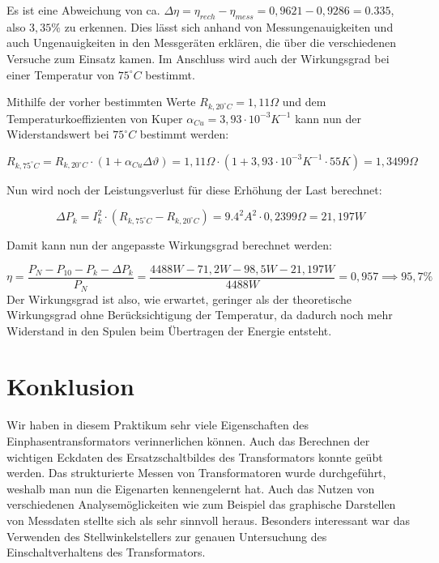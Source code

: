\documentclass{article}
\begin{document}
Es ist eine Abweichung von ca. $\Delta \eta = \eta_{rech} - \eta_{mess} = 0,9621 - 0,9286 = 0.335$, also $3,35\%$ zu erkennen. Dies lässt sich anhand von Messungenauigkeiten und auch Ungenauigkeiten in den Messgeräten erklären, die über die verschiedenen Versuche zum Einsatz kamen. Im Anschluss wird auch der Wirkungsgrad bei einer Temperatur von $75^{\circ}C$ bestimmt.

Mithilfe der vorher bestimmten Werte $R_{k,20^{\circ}C} = 1,11\Omega$ und dem Temperaturkoeffizienten von Kuper $\alpha_{Cu} = 3,93 \cdot 10^{-3}K^{-1}$ kann nun der Widerstandswert bei $75^{\circ}C$ bestimmt werden:

\begin{equation*}
  \label{eq:4}
  R_{k,75^{\circ}C} = R_{k, 20^{\circ}C} \cdot (1+\alpha_{Cu}\Delta\vartheta) = 1,11\Omega \cdot (1+3,93\cdot 10^{-3}K^{-1}\cdot 55K) = 1,3499\Omega
\end{equation*}

Nun wird noch der Leistungsverlust für diese Erhöhung der Last berechnet:

\begin{equation*}
  \label{eq:2}
  \Delta P_{k} = I_{k}^{2} \cdot (R_{k,75^{\circ}C} - R_{k,20^{\circ}C}) = 9.4^{2}A^{2} \cdot 0,2399\Omega = 21,197W
\end{equation*}

Damit kann nun der angepasste Wirkungsgrad berechnet werden:

\begin{equation*}
  \label{eq:5}
  \eta = \frac{P_{N} - P_{10} - P_{k} - \Delta P_{k}}{P_{N}} = \frac{4488W-71,2W-98,5W-21,197W}{4488W} = 0,957 \implies 95,7\%
\end{equation*}
Der Wirkungsgrad ist also, wie erwartet, geringer als der theoretische Wirkungsgrad ohne Berücksichtigung der Temperatur, da dadurch noch mehr Widerstand in den Spulen beim Übertragen der Energie entsteht.

\section{Konklusion}
\label{sec:konklusion}

Wir haben in diesem Praktikum sehr viele Eigenschaften des Einphasentransformators verinnerlichen können. Auch das Berechnen der wichtigen Eckdaten des Ersatzschaltbildes des Transformators konnte geübt werden. Das strukturierte Messen von Transformatoren wurde durchgeführt, weshalb man nun die Eigenarten kennengelernt hat. Auch das Nutzen von verschiedenen Analysemöglickeiten wie zum Beispiel das graphische Darstellen von Messdaten stellte sich als sehr sinnvoll heraus. Besonders interessant war das Verwenden des Stellwinkelstellers zur genauen Untersuchung des Einschaltverhaltens des Transformators.
\end{document}

